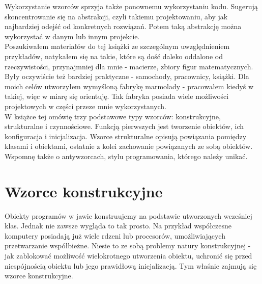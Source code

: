 \documentclass[12pt,a4paper]{article}
\begin{document}
	Wykorzystanie wzorców sprzyja także ponownemu wykorzystaniu kodu. Sugerują skoncentrowanie się na abstrakcji, czyli takiemu projektowaniu, aby jak najbardziej odejść od konkretnych rozwiązań. Potem taką abstrakcję można wykorzystać w danym lub innym projekcie.\\
	Poszukiwałem materiałów do tej książki ze szczególnym uwzględnieniem przykładów, natykałem się na takie, które są dość daleko oddalone od rzeczywistości, przynajmniej dla mnie - macierze, zbiory figur matematycznych. Były oczywiście też bardziej praktyczne - samochody, pracownicy, książki. Dla moich celów utworzyłem wymyśloną fabrykę marmolady - pracowałem kiedyś w takiej, więc w miarę się orientuję. Tak fabryka posiada wiele możliwości projektowych w części przeze mnie wykorzystanych.\\
	W książce tej omówię trzy podstawowe typy wzorców: konstrukcyjne, strukturalne i czynnościowe. Funkcją pierwszych jest tworzenie obiektów, ich konfiguracja i inicjalizacja. Wzorce strukturalne opisują powiązania pomiędzy klasami i obiektami, ostatnie z kolei zachowanie powiązanych ze sobą obiektów.\\
	Wspomnę także o antywzorcach, stylu programowania, którego należy unikać.\\
	\part{Wzorce konstrukcyjne}
	Obiekty programów w jawie konstruujemy na podstawie utworzonych wcześniej klas. Jednak nie zawsze wygląda to tak prosto. Na przykład współczesne komputery posiadają już wiele rdzeni lub procesorów, umożliwiających przetwarzanie współbieżne. Niesie to ze sobą problemy natury konstrukcyjnej - jak zablokować możliwość wielokrotnego utworzenia obiektu, uchronić się przed niespójnością obiektu lub jego prawidłową inicjalizacją. Tym właśnie zajmują się wzorce konstrukcyjne.
\end{document}
